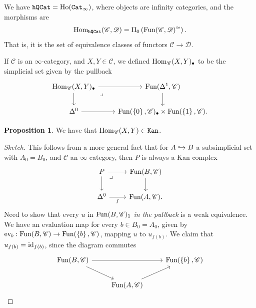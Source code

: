 \documentclass[12pt]{amsart}
\theoremstyle{definition}
\newtheorem{proposition}[theorem]{Proposition}
\providecommand{\hQCat}{\texttt{hQCat}}
\begin{document}
We have $\hQCat = \Ho(\Cat_\infty)$, where objects are infinity categories, and the morphisms are
\begin{align*}
    \Hom_\hQCat(\mathscr{C},\mathscr{D}) = \Pi_0 \left( \Fun(\mathscr{C},\mathscr{D})^\simeq \right).
\end{align*}
That is, it is the set of equivalence classes of functors $\mathscr{C} \to \mathscr{D}$.

If $\mathscr{C}$ is an $\infty$-category, and $X,Y\in \mathscr{C}$, we defined $\text{Hom}_\mathscr{C}(X,Y)_\bullet$ to be the simplicial set given by the pullback
\[ \begin{tikzcd}
    \Hom_\mathscr{C}(X,Y)_\bullet\rar\dar\pb & \Fun(\Delta^1,\mathscr{C})\dar\\
    \Delta^0\rar & \Fun(\left\{ 0 \right\}, \mathscr{C})_\bullet \times \Fun(\left\{ 1 \right\}, \mathscr{C}).
\end{tikzcd} \]

\begin{proposition} We have that $\text{Hom}_\mathscr{C}(X,Y) \in \texttt{Kan}$.
\end{proposition}
\begin{proof}[Sketch] This follows from a more general fact that for $A \xhookrightarrow{} B$ a subsimplicial set with $A_0 = B_0$, and $\mathscr{C}$ an $\infty$-category, then $P$ is always a Kan complex
\[ \begin{tikzcd}
    P\rar\dar\pb & \Fun(B,\mathscr{C})\dar\\
    \Delta^0\rar["f" below] & \Fun(A,\mathscr{C}).
\end{tikzcd} \]
Need to show that every $u$ in $\text{Fun}(B, \mathscr{C})_1$ \textit{in the pullback} is a weak equivalence. We have an evaluation map for every $b\in B_0 = A_0$, given by $\text{ev}_b: \text{Fun}(B,\mathscr{C}) \to \text{Fun}(\left\{ b \right\}, \mathscr{C})$, mapping $u$ to $u_{f(b)}$. We claim that $u_{f(b)} = \text{id}_{f(b)}$, since the diagram commutes
\[ \begin{tikzcd}
    \Fun(B,\mathscr{C})\ar[rr]\ar[dr] &  & \Fun(\left\{ b \right\},\mathscr{C})\\
     & \Fun(A,\mathscr{C})\ar[ur] & 
\end{tikzcd} \]
\end{proof}
\end{document}
